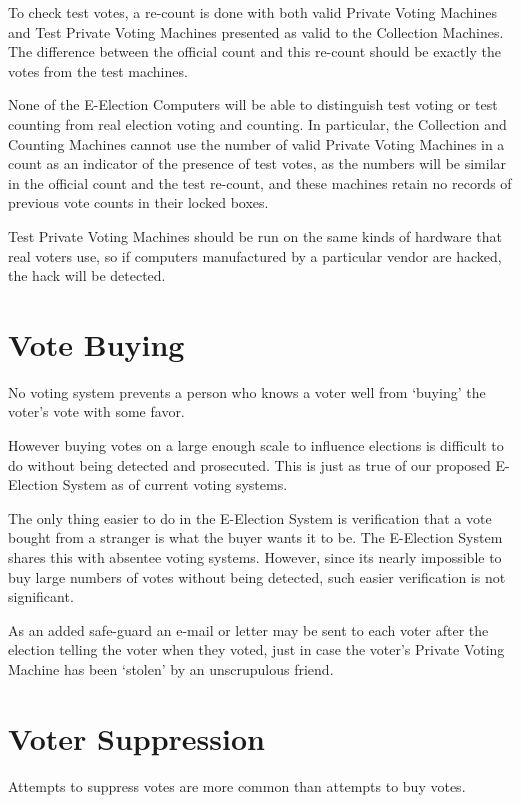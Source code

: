 \documentclass[12pt]{article}
\begin{document}
To check test votes, a re-count is done with both valid Private Voting
Machines and Test Private Voting Machines presented as valid to the
Collection Machines.  The difference between the official count and
this re-count should be exactly the votes from the test machines.

None of the E-Election Computers will be able to distinguish
test voting or test counting from real election voting and counting.
In particular, the Collection and Counting Machines cannot use the
number of valid Private Voting Machines in a count as an indicator
of the presence of test votes, as the numbers will be similar in the
official count and the test re-count, and these machines retain no
records of previous vote counts in their locked boxes.

Test Private Voting Machines should be run on the same kinds of
hardware that real voters use, so if computers manufactured by a
particular vendor are hacked, the hack will be detected.


\section{Vote Buying}

No voting system prevents a person who knows a voter well from
`buying' the voter's vote with some favor.

However buying votes on a large enough scale to influence elections
is difficult to do without being detected and prosecuted.
This is just as true of our proposed E-Election System as of
current voting systems.

The only thing easier to do in the E-Election System is verification
that a vote bought from a stranger
is what the buyer wants it to be.  The E-Election
System shares this with absentee voting systems.  However, since its
nearly impossible to buy large numbers of votes without being detected,
such easier verification is not significant.

As an added safe-guard an e-mail or letter may be sent to each voter after the
election telling the voter when they voted, just in case the voter's
Private Voting Machine has been `stolen' by an unscrupulous friend.

\section{Voter Suppression}

Attempts to suppress votes are more common than attempts to buy votes.
\end{document}
